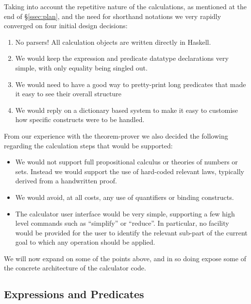 Taking into account the repetitive nature of the calculations,
as mentioned at the end of \S\ref{ssec:plan},
and the need for shorthand notations we very rapidly converged
on four initial design decisions:
\begin{enumerate}
  \item No parsers! All calculation objects are written
  directly in Haskell.
  \item We would keep the expression and predicate datatype declarations
   very simple, with only equality being singled out.
  \item We would need to have a good way to pretty-print long predicates
    that made it easy to see their overall structure
  \item We would reply on a dictionary based system to
    make it easy to customise how specific constructs
    were to be handled.
\end{enumerate}
From our experience with the  theorem-prover we also decided
the following regarding the calculation steps that would be supported:
\begin{itemize}
  \item
    We would not support full  propositional calculus
    or theories of numbers or sets.
    Instead we would support the use of hard-coded relevant laws,
    typically derived from  a handwritten proof.
  \item
    We would avoid, at all costs,
    any use of quantifiers or binding constructs.
  \item
    The calculator user interface would be very simple,
    supporting a few high level commands such as ``simplify''
    or ``reduce''.
    In particular,
    no facility would be provided for the user to identify
    the relevant sub-part of the current goal to which any operation
    should be applied.
\end{itemize}

We will now expand on some of the points above,
and in so doing expose some of the concrete architecture of the calculator code.

\subsection{Expressions and Predicates}\label{ssec:expr-pred}

